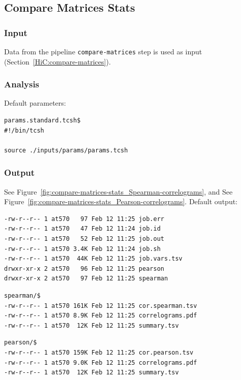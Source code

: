 \subsection{Compare Matrices Stats}\label{HiC:compare-matrices-stats}%
\subsubsection{Input} %
Data from the pipeline \texttt{compare-matrices} step is used as input (Section~\ref{HiC:compare-matrices}).
\subsubsection{Analysis} %
Default parameters:
\begin{lstlisting}
params.standard.tcsh$
#!/bin/tcsh

source ./inputs/params/params.tcsh
\end{lstlisting}
\subsubsection{Output} %
See Figure~\ref{fig:compare-matrices-stats_Spearman-correlograms}, and See Figure~\ref{fig:compare-matrices-stats_Pearson-correlograms}. Default output: %
\begin{lstlisting}
-rw-r--r-- 1 at570   97 Feb 12 11:25 job.err
-rw-r--r-- 1 at570   47 Feb 12 11:24 job.id
-rw-r--r-- 1 at570   52 Feb 12 11:25 job.out
-rw-r--r-- 1 at570 3.4K Feb 12 11:24 job.sh
-rw-r--r-- 1 at570  44K Feb 12 11:25 job.vars.tsv
drwxr-xr-x 2 at570   96 Feb 12 11:25 pearson
drwxr-xr-x 2 at570   97 Feb 12 11:25 spearman
\end{lstlisting}

\begin{lstlisting}
spearman/$
-rw-r--r-- 1 at570 161K Feb 12 11:25 cor.spearman.tsv
-rw-r--r-- 1 at570 8.9K Feb 12 11:25 correlograms.pdf
-rw-r--r-- 1 at570  12K Feb 12 11:25 summary.tsv
\end{lstlisting}

\begin{lstlisting}
pearson/$
-rw-r--r-- 1 at570 159K Feb 12 11:25 cor.pearson.tsv
-rw-r--r-- 1 at570 9.0K Feb 12 11:25 correlograms.pdf
-rw-r--r-- 1 at570  12K Feb 12 11:25 summary.tsv
\end{lstlisting}

